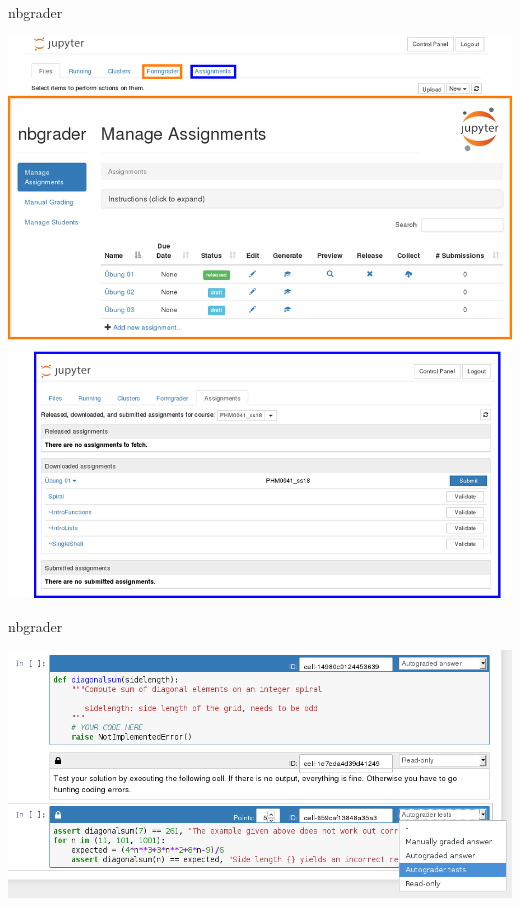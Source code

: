 \documentclass[t, utf8, 10pt]{beamer}
\begin{document}
\begin{frame}{nbgrader}
 \begin{center}
  \includegraphics[height=0.85\textheight]{nbgrader}
 \end{center}
\end{frame}

\begin{frame}{nbgrader}
 \begin{center}
  \includegraphics[width=\textwidth]{nbgradercells}

  \vspace{1truecm}
  \begin{Large}
  \alert{}
  \end{Large}
 \end{center}
\end{frame}
\end{document}
